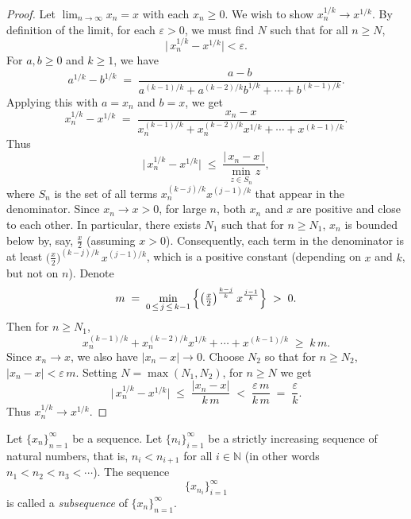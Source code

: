 \documentclass[../main.tex]{subfiles}
\begin{document}
    
    
    \begin{proof}
        Let \(\lim_{n\to\infty} x_n = x\) with each \(x_n \ge 0\). We wish to show \(x_n^{1/k} \to x^{1/k}\). By definition of the limit, for each \(\varepsilon > 0\), we must find \(N\) such that for all \(n \ge N\),
\[
\bigl|\,x_n^{1/k} - x^{1/k}\bigr| < \varepsilon.
\]
For \(a,b \ge 0\) and \(k\ge 1\), we have
   \[
     a^{1/k} - b^{1/k}
     \;=\;
     \frac{a - b}{a^{(k-1)/k} + a^{(k-2)/k}b^{1/k} + \cdots + b^{(k-1)/k}}.
   \]
   Applying this with \(a = x_n\) and \(b = x\), we get
   \[
     x_n^{1/k} - x^{1/k}
     \;=\;
     \frac{x_n - x}{x_n^{(k-1)/k} + x_n^{(k-2)/k}x^{1/k} + \cdots + x^{(k-1)/k}}.
   \]
   Thus
   \[
     \bigl|\,x_n^{1/k} - x^{1/k}\bigr|
     \;\le\;
     \frac{|\,x_n - x\,|}{\min\limits_{z \in S_n} z},
   \]
   where \(S_n\) is the set of all terms \(x_n^{(k-j)/k} x^{(j-1)/k}\) that appear in the denominator. 
   Since \(x_n \to x > 0\), for large \(n\), both \(x_n\) and \(x\) are positive and close to each other. In particular, there exists \(N_1\) such that for \(n \ge N_1\), \(x_n\) is bounded below by, say, \(\tfrac{x}{2}\) (assuming \(x>0\)). Consequently, each term in the denominator is at least \(\bigl(\tfrac{x}{2}\bigr)^{(k-j)/k}\,x^{(j-1)/k}\), which is a positive constant (depending on \(x\) and \(k\), but not on \(n\)). Denote
   \[
     m \;=\;
     \min_{0 \,\le\, j \,\le\, k-1}\,\Bigl\{\bigl(\tfrac{x}{2}\bigr)^{\frac{k-j}{k}}\,x^{\frac{j-1}{k}}\Bigr\}
     \;>\;
     0.
   \]
   Then for \(n \ge N_1\),
   \[
     x_n^{(k-1)/k} + x_n^{(k-2)/k}x^{1/k} + \cdots + x^{(k-1)/k}
     \;\ge\;
     k\,m.
   \]
   Since \(x_n \to x\), we also have \(\bigl|x_n - x\bigr|\to 0\). Choose \(N_2\) so that for \(n \ge N_2\), \(\bigl|x_n - x\bigr| < \varepsilon\,m\). Setting \(N = \max(N_1, N_2)\), for \(n \ge N\) we get
   \[
     \bigl|\,x_n^{1/k} - x^{1/k}\bigr|
     \;\le\;
     \frac{|x_n - x|}{k\,m}
     \;<\;
     \frac{\varepsilon\,m}{k\,m}
     \;=\;
     \frac{\varepsilon}{k}.
   \]
   Thus \(x_n^{1/k} \to x^{1/k}\).


    \end{proof}
    
    
    
    
    
    
    \begin{definition} \label{def:subsequence}
    Let \( \{x_n\}_{n=1}^{\infty} \) be a sequence. Let \( \{n_i\}_{i=1}^{\infty} \) be a strictly increasing sequence of natural numbers, that is, \( n_i < n_{i+1} \) for all \( i \in \mathbb{N} \) (in other words \( n_1 < n_2 < n_3 < \cdots \)). The sequence
    \[
    \{x_{n_i}\}_{i=1}^{\infty}
    \]
    is called a \textit{subsequence} of \( \{x_n\}_{n=1}^{\infty} \).
    \end{definition}
    
\end{document}
